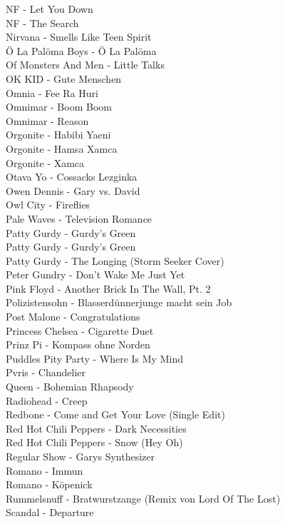 NF - Let You Down\\
NF - The Search\\
Nirvana - Smells Like Teen Spirit\\
Ö La Palöma Boys - Ö La Palöma\\
Of Monsters And Men - Little Talks\\
OK KID - Gute Menschen\\
Omnia - Fee Ra Huri\\
Omnimar - Boom Boom\\
Omnimar - Reason\\
Orgonite - Habibi Yaeni\\
Orgonite - Hamsa Xamca\\
Orgonite - Xamca\\
Otava Yo - Cossacks Lezginka\\
Owen Dennis - Gary vs. David\\
Owl City - Fireflies\\
Pale Waves - Television Romance\\
Patty Gurdy - Gurdy's Green\\
Patty Gurdy - Gurdy's Green\\
Patty Gurdy - The Longing (Storm Seeker Cover)\\
Peter Gundry - Don't Wake Me Just Yet\\
Pink Floyd - Another Brick In The Wall, Pt. 2\\
Polizistensohn - Blasserdünnerjunge macht sein Job\\
Post Malone - Congratulations\\
Princess Chelsea - Cigarette Duet\\
Prinz Pi - Kompass ohne Norden\\
Puddles Pity Party - Where Is My Mind\\
Pvris - Chandelier\\
Queen - Bohemian Rhapsody\\
Radiohead - Creep\\
Redbone - Come and Get Your Love (Single Edit)\\
Red Hot Chili Peppers - Dark Necessities\\
Red Hot Chili Peppers - Snow (Hey Oh)\\
Regular Show - Garys Synthesizer\\
Romano - Immun\\
Romano - Köpenick\\
Rummelsnuff - Bratwurstzange (Remix von Lord Of The Lost)\\
Scandal - Departure\\

